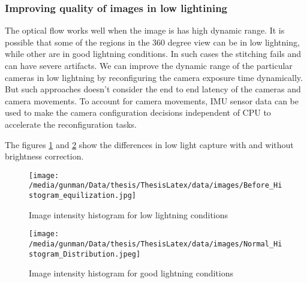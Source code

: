 \subsubsection{Improving quality of images in low lightining}
The optical flow works well when the image is has high dynamic range. It is possible that some of the regions in the 360 degree view can be in low lightning, while other are in good lightning conditions. In such cases the stitching fails and can have severe artifacts. We can improve the dynamic range of the particular cameras in low lightning by reconfiguring the camera exposure time dynamically. But such approaches doesn't consider the end to end latency of the cameras and camera movements. To account for camera movements, IMU sensor data can be used to make the camera configuration decisions independent of CPU to accelerate the reconfiguration tasks. 

The figures \ref{fig:histLow} and  \ref{fig:histHigh} show the differences in low light capture with and without brightness correction.
	\begin{figure}[h]
	\begin{center}
		\texttt{[image: /media/gunman/Data/thesis/ThesisLatex/data/images/Before\_Histogram\_equilization.jpg]}
		\caption{Image intensity histogram for low lightning conditions}
		\label{fig:histLow}
	\end{center}
	\vspace{-0.3in}
\end{figure} 

\begin{figure}[h]
	\begin{center}
		\texttt{[image: /media/gunman/Data/thesis/ThesisLatex/data/images/Normal\_Histogram\_Distribution.jpeg]}
		\caption{Image intensity histogram for good lightning conditions}
		\label{fig:histHigh}
	\end{center}
	\vspace{-0.3in}
\end{figure} 

